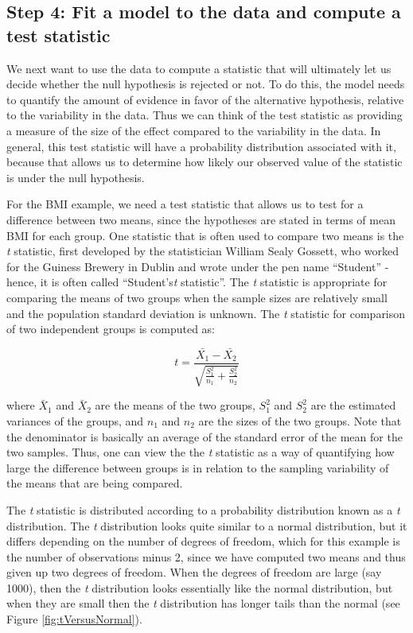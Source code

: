 \documentclass[12pt,]{book}
\theoremstyle{definition}
\theoremstyle{definition}
\theoremstyle{definition}
\theoremstyle{remark}
\begin{document}
\hypertarget{step-4-fit-a-model-to-the-data-and-compute-a-test-statistic}{%
\subsection{Step 4: Fit a model to the data and compute a test statistic}\label{step-4-fit-a-model-to-the-data-and-compute-a-test-statistic}}

We next want to use the data to compute a statistic that will ultimately let us decide whether the null hypothesis is rejected or not. To do this, the model needs to quantify the amount of evidence in favor of the alternative hypothesis, relative to the variability in the data. Thus we can think of the test statistic as providing a measure of the size of the effect compared to the variability in the data. In general, this test statistic will have a probability distribution associated with it, because that allows us to determine how likely our observed value of the statistic is under the null hypothesis.

For the BMI example, we need a test statistic that allows us to test for a difference between two means, since the hypotheses are stated in terms of mean BMI for each group. One statistic that is often used to compare two means is the \emph{t} statistic, first developed by the statistician William Sealy Gossett, who worked for the Guiness Brewery in Dublin and wrote under the pen name ``Student'' - hence, it is often called ``Student's\emph{t} statistic''. The \emph{t} statistic is appropriate for comparing the means of two groups when the sample sizes are relatively small and the population standard deviation is unknown. The \emph{t} statistic for comparison of two independent groups is computed as:

\[
t = \frac{\bar{X_1} - \bar{X_2}}{\sqrt{\frac{S_1^2}{n_1} + \frac{S_2^2}{n_2}}}
\]

where \(\bar{X}_1\) and \(\bar{X}_2\) are the means of the two groups, \(S^2_1\) and \(S^2_2\) are the estimated variances of the groups, and \(n_1\) and \(n_2\) are the sizes of the two groups. Note that the denominator is basically an average of the standard error of the mean for the two samples. Thus, one can view the the \emph{t} statistic as a way of quantifying how large the difference between groups is in relation to the sampling variability of the means that are being compared.

The \emph{t} statistic is distributed according to a probability distribution known as a \emph{t} distribution. The \emph{t} distribution looks quite similar to a normal distribution, but it differs depending on the number of degrees of freedom, which for this example is the number of observations minus 2, since we have computed two means and thus given up two degrees of freedom. When the degrees of freedom are large (say 1000), then the \emph{t} distribution looks essentially like the normal distribution, but when they are small then the \emph{t} distribution has longer tails than the normal (see Figure \ref{fig:tVersusNormal}).
\end{document}
